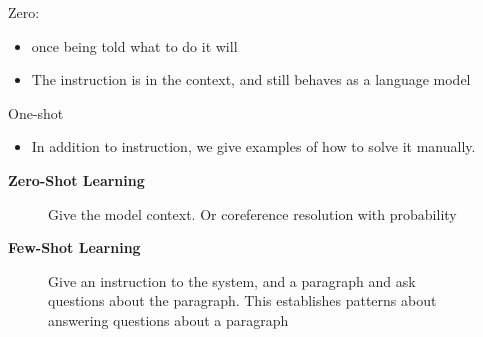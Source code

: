 \documentclass[11pt]{article}
\begin{document}
\begin{minipage}[l]{.5\linewidth}
    \begin{figure}[H]
        \centering
    \end{figure}    
\end{minipage}\hfill
\begin{minipage}[r]{.48\linewidth}
    Zero:
    \begin{itemize}
        \item once being told what to do it will
        \item The instruction is in the context, and still behaves as a language model
    \end{itemize}
    One-shot
    \begin{itemize}
        \item In addition to instruction, we give examples of how to solve it manually.
    \end{itemize}
\end{minipage}

\textbf{Zero-Shot Learning}

\begin{figure}[H]
    \centering
    \caption*{Give the model context. Or coreference resolution with probability}
\end{figure}    

\textbf{Few-Shot Learning}

    \begin{figure}[H]
        \centering
        \caption*{Give an instruction to the system, and a paragraph and ask questions about the paragraph. This establishes patterns about answering questions about a paragraph}
    \end{figure}    
\end{document}

